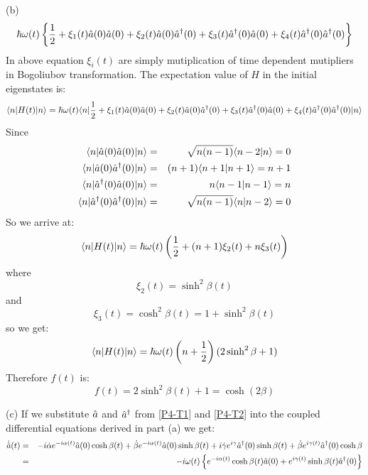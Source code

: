 \begin{homeworkProblem}
\begin{homeworkSection}{(b)}
\begin{multline}
\hbar\omega(t)\left\{\frac{1}{2}+\xi_1(t)\Hat{a}(0)\Hat{a}(0)+\xi_2(t)\Hat{a}(0)\Hat{a}^\dagger(0)+\xi_3(t)\Hat{a}^\dagger(0)\Hat{a}(0)+\xi_4(t)\Hat{a}^\dagger(0)\Hat{a}^\dagger(0)\right\}
\end{multline}
In above equation $\xi_i(t)$ are simply mutiplication of time dependent mutipliers in Bogoliubov transformation. The expectation value of $H$ in the initial eigenstates is:
\begin{equation}
\langle n|H(t)|n\rangle=\hbar\omega(t)\langle n|\frac{1}{2}+\xi_1(t)\Hat{a}(0)\Hat{a}(0)+\xi_2(t)\Hat{a}(0)\Hat{a}^\dagger(0)+\xi_3(t)\Hat{a}^\dagger(0)\Hat{a}(0)+\xi_4(t)\Hat{a}^\dagger(0)\Hat{a}^\dagger(0)|n\rangle
\end{equation}
Since
\begin{eqnarray}
\langle n|\Hat{a}(0)\Hat{a}(0)|n\rangle&=&\sqrt{n(n-1)}\langle n-2|n\rangle=0\\
\langle n|\Hat{a}(0)\Hat{a}^\dagger(0)|n\rangle&=&(n+1)\langle n+1|n+1\rangle=n+1\\
\langle n|\Hat{a}^\dagger(0)\Hat{a}(0)|n\rangle&=&n\langle n-1|n-1\rangle=n\\
\langle n|\Hat{a}^\dagger(0)\Hat{a}^\dagger(0)|n\rangle&=&\sqrt{n(n-1)}\langle n|n-2\rangle=0
\end{eqnarray}
So we arrive at:
\begin{equation}
\langle n|H(t)|n\rangle=\hbar\omega(t)\left(\frac{1}{2}+(n+1)\xi_2(t)+n\xi_3(t)\right)
\end{equation}
where 
$$\xi_2(t)=\sinh^2\beta(t)$$
and
$$\xi_3(t)=\cosh^2\beta(t)=1+\sinh^2\beta(t)$$
so we get:
\begin{equation}
\langle n|H(t)|n\rangle=\hbar\omega(t)\left(n+\frac{1}{2}\right)(2\sinh^2\beta+1)
\end{equation}
Therefore $f(t)$ is:
\begin{equation}
f(t)=2\sinh^2\beta(t)+1=\cosh(2\beta)
\end{equation}
\end{homeworkSection}
\begin{homeworkSection}{(c)}
If we substitute $\Hat{a}$ and $\Hat{a}^\dagger$ from \eqref{P4-T1} and \eqref{P4-T2} into the coupled differential equations derived in part (a) we get:
\begin{eqnarray}
\dot{\A{a}}(t) &=&-i\dot{\alpha}e^{-i\alpha(t)}\A{a}(0)\cosh\beta(t)+\dot{\beta}e^{-i\alpha(t)}\A{a}(0)\sinh\beta(t)+i\dot{\gamma}e^{i\gamma }\A{a}^\dagger(0)\sinh\beta(t)+\dot{\beta}e^{i\gamma(t)}
\A{a}^\dagger(0)\cosh\beta\nonumber\\
&=&-i\omega(t)\left\{e^{-i\alpha(t)}\cosh\beta(t)\A{a}(0)+e^{i\gamma(t)}\sinh\beta(t)\A{a}^\dagger(0)\right\}\nonumber\\

\end{eqnarray}
\end{homeworkSection}
\end{homeworkProblem}
